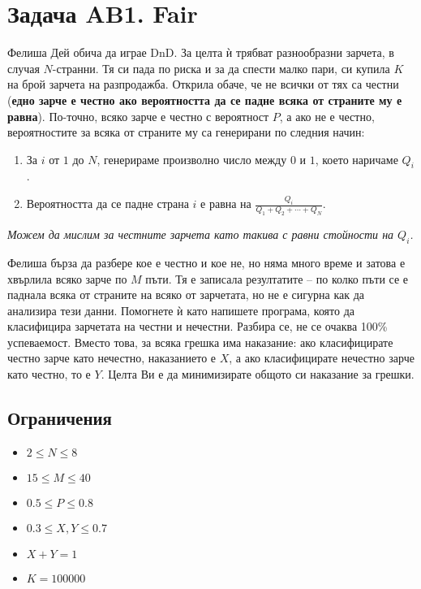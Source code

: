 \documentclass[12pt]{article}
\begin{document}
	
\section{Задача AB1. Fair}

Фелиша Дей обича да играе DnD. За целта ѝ трябват разнообразни зарчета, в случая $N$-странни. Тя си пада по риска и за да спести малко пари, си купила $K$ на брой зарчета на разпродажба. Открила обаче, че не всички от тях са честни (\textbf{едно зарче е честно ако вероятността да се падне всяка от страните му е равна}). По-точно, всяко зарче е честно с вероятност $P$, а ако не е честно, вероятностите за всяка от страните му са генерирани по следния начин:

\begin{enumerate}

\item За $i$ от $1$ до $N$, генерираме произволно число между $0$ и $1$, което наричаме $Q_i$.

\item Вероятността да се падне страна $i$ е равна на $\frac{Q_i}{Q_1 + Q_2 + \dotsb + Q_N}$.

\end{enumerate}
\textit{Можем да мислим за честните зарчета като такива с равни стойности на $Q_i$.}

Фелиша бърза да разбере кое е честно и кое не, но няма много време и затова е хвърлила всяко зарче по $M$ пъти. Тя е записала резултатите -- по колко пъти се е паднала всяка от страните на всяко от зарчетата, но не е сигурна как да анализира тези данни. Помогнете ѝ като напишете програма, която да класифицира зарчетата на честни и нечестни. Разбира се, не се очаква 100\% успеваемост. Вместо това, за всяка грешка има наказание: ако класифицирате честно зарче като нечестно, наказанието е $X$, а ако класифицирате нечестно зарче като честно, то е $Y$. Целта Ви е да минимизирате общото си наказание за грешки.

\subsection{Ограничения}
\vspace{0.1em}
\begin{itemize}
    \item $2 \leq N \leq 8$
    \item $15 \leq M \leq 40$
    \item $0.5 \leq P \leq 0.8$
    \item $0.3 \leq X, Y \leq 0.7$
    \item $X + Y = 1$
    \item $K = 100000$
\end{itemize}
\end{document}
